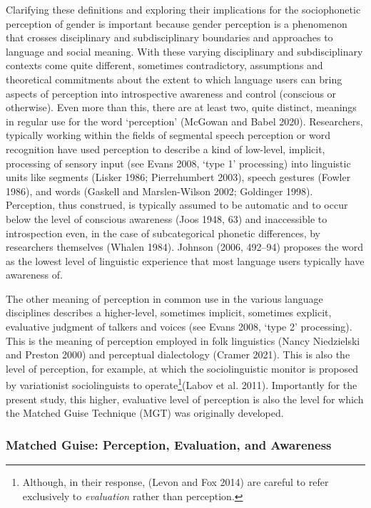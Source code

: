 \documentclass[
  letterpaper,
  DIV=11,
  numbers=noendperiod]{scrartcl}
\begin{document}
Clarifying these definitions and exploring their implications for the
sociophonetic perception of gender is important because gender
perception is a phenomenon that crosses disciplinary and subdisciplinary
boundaries and approaches to language and social meaning. With these
varying disciplinary and subdisciplinary contexts come quite different,
sometimes contradictory, assumptions and theoretical commitments about
the extent to which language users can bring aspects of perception into
introspective awareness and control (conscious or otherwise). Even more
than this, there are at least two, quite distinct, meanings in regular
use for the word `perception' (McGowan and Babel 2020). Researchers,
typically working within the fields of segmental speech perception or
word recognition have used perception to describe a kind of low-level,
implicit, processing of sensory input (see Evans 2008, `type 1'
processing) into linguistic units like segments (Lisker 1986;
Pierrehumbert 2003), speech gestures (Fowler 1986), and words (Gaskell
and Marslen-Wilson 2002; Goldinger 1998). Perception, thus construed, is
typically assumed to be automatic and to occur below the level of
conscious awareness (Joos 1948, 63) and inaccessible to introspection
even, in the case of subcategorical phonetic differences, by researchers
themselves (Whalen 1984). Johnson (2006, 492--94) proposes the word as
the lowest level of linguistic experience that most language users
typically have awareness of.

The other meaning of perception in common use in the various language
disciplines describes a higher-level, sometimes implicit, sometimes
explicit, evaluative judgment of talkers and voices (see Evans 2008,
`type 2' processing). This is the meaning of perception employed in folk
linguistics (Nancy Niedzielski and Preston 2000) and perceptual
dialectology (Cramer 2021). This is also the level of perception, for
example, at which the sociolinguistic monitor is proposed by
variationist sociolinguists to operate\footnote{Although, in their
  response, (Levon and Fox 2014) are careful to refer exclusively to
  \emph{evaluation} rather than perception.}(Labov et al. 2011).
Importantly for the present study, this higher, evaluative level of
perception is also the level for which the Matched Guise Technique (MGT)
was originally developed.

\subsubsection{Matched Guise: Perception, Evaluation, and
Awareness}\label{sub-mgt}
\end{document}
